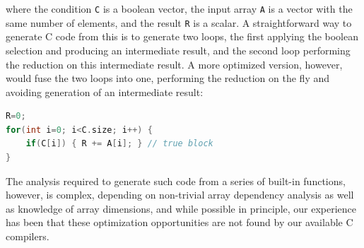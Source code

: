 
\noindent{}where the condition \texttt{C} is a boolean vector, the input array \texttt{A}
is a vector with the same number of elements, and the result \texttt{R} is a
scalar.  A straightforward way to generate C code from this is to generate two loops, the first applying the boolean selection and producing an intermediate result, and the second loop performing the reduction on this intermediate result.  A more optimized version, however, would fuse the two loops into one, performing the reduction on the fly and avoiding generation of an intermediate result:

\begin{center}
\begin{minipage}{\linewidth}
\begin{small}
\begin{lstlisting}[language=C, frame=single, xleftmargin=0mm, xrightmargin=5mm]
R=0;
for(int i=0; i<C.size; i++) {
    if(C[i]) { R += A[i]; } // true block
}
\end{lstlisting}
\end{small}
\end{minipage}
\end{center}



\noindent{}The analysis required to generate such code from a series of built-in functions, however, is complex,
depending on non-trivial array dependency analysis as well as knowledge of array dimensions, and 
while possible in principle, our experience has been that these optimization opportunities are not found by our available C compilers.


